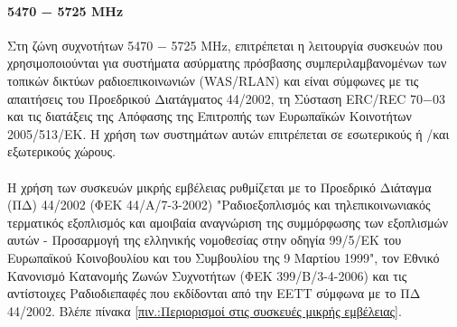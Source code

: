 \documentclass[a4paper, 12pt, twoside]{report}
\begin{document}
{{{{{			\paragraph{5470 − 5725 ΜΗz}{Στη ζώνη συχνοτήτων 5470 − 5725 ΜΗz, επιτρέπεται η λειτουργία συσκευών που χρησιμοποιούνται για συστήματα ασύρματης πρόσβασης συμπεριλαμβανομένων των τοπικών δικτύων ραδιοεπικοινωνιών (WAS/RLAN) και είναι σύμφωνες με τις απαιτήσεις του Προεδρικού Διατάγματος 44/2002, τη Σύσταση ERC/REC 70−03 και τις διατάξεις της Απόφασης της Επιτροπής των Ευρωπαϊκών Κοινοτήτων 2005/513/ΕΚ. Η χρήση των συστημάτων αυτών επιτρέπεται σε εσωτερικούς ή /και εξωτερικούς χώρους.
			}
			\paragraph{}{Η χρήση των συσκευών μικρής εμβέλειας ρυθμίζεται με το Προεδρικό Διάταγμα (ΠΔ) 44/2002 (ΦΕΚ 44/Α/7-3-2002) "Ραδιοεξοπλισμός και τηλεπικοινωνιακός τερματικός εξοπλισμός και αμοιβαία αναγνώριση της συμμόρφωσης των εξοπλισμών αυτών - Προσαρμογή της ελληνικής νομοθεσίας στην οδηγία 99/5/ΕΚ του Ευρωπαϊκού Κοινοβουλίου και του Συμβουλίου της 9 Μαρτίου 1999", τον Εθνικό Κανονισμό Κατανομής Ζωνών Συχνοτήτων (ΦΕΚ 399/Β/3-4-2006) και τις αντίστοιχες Ραδιοδιεπαφές που εκδίδονται από την ΕΕΤΤ σύμφωνα με το ΠΔ 44/2002. Βλέπε πίνακα \ref{πιν.:Περιορισμοί στις συσκευές μικρής εμβέλειας}.
			}
			
			\begin{landscape}	
			\setlength\LTleft{0pt}            %
			\setlength\LTright{0pt}           %
	

\end{landscape}}}}}}
\end{document}
